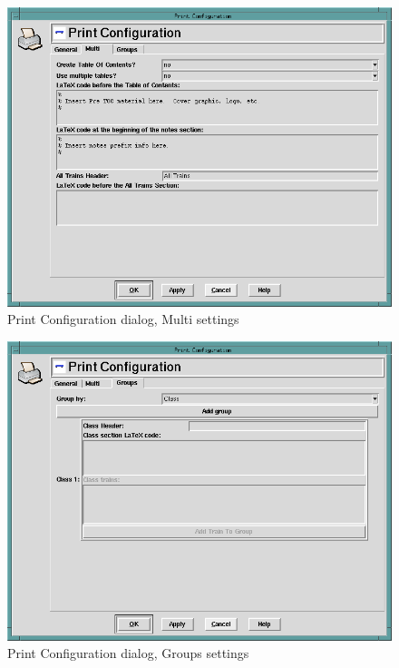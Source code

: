 \begin{figure}[hbpt]
\begin{centering}
\includegraphics[width=5in]{TTPrintConfigurationDialog2.png}
\caption{Print Configuration dialog, Multi settings}
\label{fig:tt:PrintConfigurationDialog2}
\end{centering}
\end{figure}
\begin{figure}[hbpt]
\begin{centering}
\includegraphics[width=5in]{TTPrintConfigurationDialog3.png}
\caption{Print Configuration dialog, Groups settings}
\label{fig:tt:PrintConfigurationDialog3}
\end{centering}
\end{figure}
